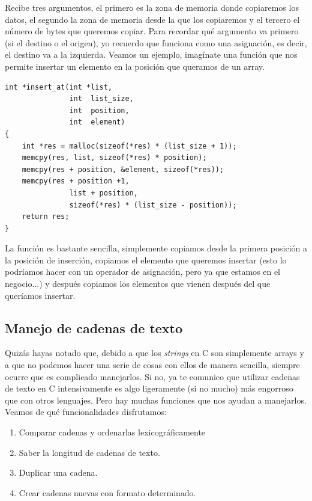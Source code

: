 \documentclass[a4paper]{article}
\begin{document}
Recibe tres argumentos, el primero es la zona de memoria donde copiaremos
los datos, el segundo la zona de memoria desde la que los copiaremos
y el tercero el número de bytes que queremos copiar. Para recordar qué argumento
va primero (si el destino o el origen), yo recuerdo que funciona como una
asignación, es decir, el destino va a la izquierda. Veamos un ejemplo, imagínate
una función que nos permite insertar un elemento en la posición que queramos de
un array.


\noindent
\begin{minipage}[H]{\linewidth}
\mbox{}
\begin{lstlisting}[style=C,
caption={Utilización de la función \texttt{memcpy}},
label={lst:memcpyExample}]
int *insert_at(int *list,
               int  list_size,
               int  position,
               int  element)
{
    int *res = malloc(sizeof(*res) * (list_size + 1));
    memcpy(res, list, sizeof(*res) * position);
    memcpy(res + position, &element, sizeof(*res));
    memcpy(res + position +1,
               list + position,
               sizeof(*res) * (list_size - position));
    return res;
}
\end{lstlisting}
\end{minipage}

La función es bastante sencilla, simplemente copiamos desde la primera posición
a la posición de inserción, copiamos el elemento que queremos insertar (esto
lo podríamos hacer con un operador de asignación, pero ya que estamos en el
negocio...) y después copiamos los elementos que vienen después del que
queríamos insertar.


\subsection{Manejo de cadenas de texto}
Quizás hayas notado que, debido a que los \emph{strings} en C son simplemente
arrays y a que no podemos hacer una serie de cosas con ellos de manera sencilla,
siempre ocurre que es complicado manejarlos. Si no, ya te comunico que utilizar
cadenas de texto en C intensivamente es algo ligeramente (si no mucho) más
engorroso que con otros lenguajes. Pero hay muchas funciones que nos ayudan
a manejarlos. Veamos de qué funcionalidades disfrutamos:

\begin{enumerate}
\item Comparar cadenas y ordenarlas lexicográficamente
\item Saber la longitud de cadenas de texto.
\item Duplicar una cadena.
\item Crear cadenas nuevas con formato determinado.
\end{enumerate}
\end{document}
